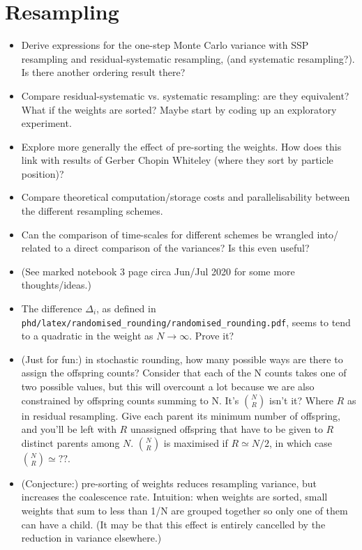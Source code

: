 \documentclass{article}
\begin{document}
\section*{Resampling}
\begin{itemize}
\item Derive expressions for the one-step Monte Carlo variance with SSP resampling and residual-systematic resampling, (and systematic resampling?). Is there another ordering result there?
\item Compare residual-systematic vs. systematic resampling: are they equivalent? What if the weights are sorted? Maybe start by coding up an exploratory experiment.
\item Explore more generally the effect of pre-sorting the weights. How does this link with results of Gerber Chopin Whiteley (where they sort by particle position)?
\item Compare theoretical computation/storage costs and parallelisability between the different resampling schemes.
\item Can the comparison of time-scales for different schemes be wrangled into/ related to a direct comparison of the variances? Is this even useful?
\item (See marked notebook 3 page circa Jun/Jul 2020 for some more thoughts/ideas.)
\item The difference $\Delta_i$, as defined in \texttt{phd/latex/randomised\_rounding/randomised\_rounding.pdf}, seems to tend to a quadratic in the weight as $N\to\infty$. Prove it?
\item (Just for fun:) in stochastic rounding, how many possible ways are there to assign the offspring counts? Consider that each of the N counts takes one of two possible values, but this will overcount a lot because we are also constrained by offspring counts summing to N. It's $\binom{N}{R}$ isn't it? Where $R$ as in residual resampling. Give each parent its minimum number of offspring, and you'll be left with $R$ unassigned offspring that have to be given to $R$ distinct parents among $N$. $\binom{N}{R}$ is maximised if $R\simeq N/2$, in which case $\binom{N}{R}\simeq ??$.
\item (Conjecture:) pre-sorting of weights reduces resampling variance, but increases the coalescence rate. Intuition: when weights are sorted, small weights that sum to less than 1/N are grouped together so only one of them can have a child. (It may be that this effect is entirely cancelled by the reduction in variance elsewhere.)
\end{itemize}
\end{document}
